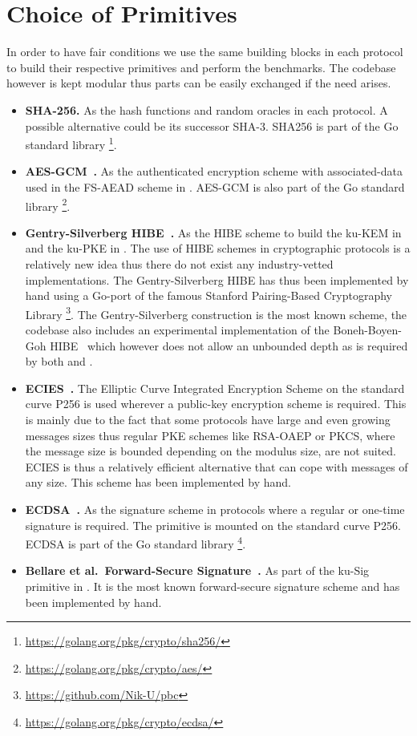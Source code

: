 \documentclass[11pt,a4paper,twoside,openright,bibliography=totoc]{scrbook}
\begin{document}
\section{Choice of Primitives}
\label{sec:choice-primitives}

In order to have fair conditions we use the same building blocks
in each protocol to build their respective primitives and
perform the benchmarks. The
codebase however is kept modular thus parts can be easily
exchanged if the need arises.
\begin{itemize}
\item \textbf{SHA-256.} As the hash functions and random
  oracles in each protocol. A possible alternative could be
  its successor SHA-3. SHA256 is part of the Go standard
  library \footnote{\url{https://golang.org/pkg/crypto/sha256/}}.
\item \textbf{AES-GCM~\cite{mcgrew2004security}.} As the authenticated
  encryption scheme with
  associated-data used in the FS-AEAD scheme in \cite{alwen2018double}.
  AES-GCM is also part of the Go standard
  library \footnote{\url{https://golang.org/pkg/crypto/aes/}}.
\item \textbf{Gentry-Silverberg HIBE~\cite{gentry2002hierarchical}.} As
  the HIBE scheme to build the ku-KEM in \cite{poettering2018towards} and
  the ku-PKE in \cite{jaeger2018optimal}. The use of HIBE schemes in
  cryptographic protocols is a relatively new idea thus there do not
  exist any industry-vetted implementations. The Gentry-Silverberg HIBE
  has thus been implemented by hand using a Go-port of the
  famous Stanford Pairing-Based Cryptography
  Library \footnote{\url{https://github.com/Nik-U/pbc}}.
  The Gentry-Silverberg construction is the most known scheme,
  the codebase also includes an experimental implementation of
  the Boneh-Boyen-Goh HIBE~\cite{boneh2005hierarchical} which however does
  not allow an unbounded
  depth as is required by both \cite{poettering2018towards} and
  \cite{jaeger2018optimal}.
\item \textbf{ECIES~\cite{shoup2001proposal}.} The Elliptic Curve Integrated
  Encryption Scheme on the standard curve P256 is used wherever a public-key
  encryption scheme is required. This is mainly due to the fact that
  some protocols have large and even growing messages sizes thus regular
  PKE schemes like RSA-OAEP or PKCS, where the message size is bounded
  depending on the modulus size, are not suited. ECIES is thus a
  relatively efficient alternative that can cope with messages
  of any size. This scheme has been implemented by hand.
\item \textbf{ECDSA~\cite{johnson2001elliptic}.} As the signature scheme in protocols where
  a regular or one-time signature is required. The primitive
  is mounted on the standard curve P256. ECDSA is part of the
  Go standard library \footnote{\url{https://golang.org/pkg/crypto/ecdsa/}}.
\item \textbf{Bellare et al.~Forward-Secure Signature~\cite{bellare1999forward}.}
  As part of the ku-Sig primitive in \cite{jaeger2018optimal}. It
  is the most known forward-secure signature scheme and has been implemented
  by hand.
\end{itemize}
\end{document}

